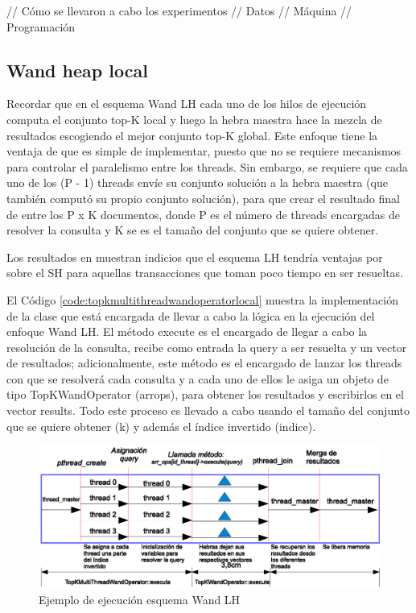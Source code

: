 // Cómo se llevaron a cabo los experimentos
// Datos
// Máquina
// Programación 


\subsection{Wand heap local}
\label{evaluacionexperimental:wlh}
Recordar que en el esquema Wand LH cada uno de los hilos de ejecución computa el conjunto top-K local y luego la hebra maestra hace la mezcla de resultados escogiendo el mejor conjunto top-K global. Este enfoque tiene la ventaja de que es simple de implementar, puesto que no se requiere mecanismos para controlar el paralelismo entre los threads. Sin embargo, se requiere que cada uno de los (P - 1) threads envíe su conjunto solución a la hebra maestra (que también computó su propio conjunto solución), para que crear el resultado final de entre los P x K documentos, donde P es el número de threads encargadas de resolver la consulta y K se es el tamaño del conjunto que se quiere obtener. 

Los resultados en \citep{Rojas:2013} muestran indicios que el esquema LH tendría ventajas por sobre el SH para aquellas transacciones que toman poco tiempo en ser resueltas. 

El Código \ref{code:topkmultithreadwandoperatorlocal} muestra la implementación de la clase que está encargada de llevar a cabo la lógica en la ejecución del enfoque Wand LH. El método execute es el encargado de llegar a cabo la resolución de la consulta, recibe como entrada la query a ser resuelta y un vector de resultados; adicionalmente, este método es el encargado de lanzar los threads con que se resolverá cada consulta y a cada uno de ellos le asiga un objeto de tipo TopKWandOperator (arrops), para obtener los resultados y escribirlos en el vector results. Todo este proceso es llevado a cabo usando el tamaño del conjunto que se quiere obtener (k) y además el índice invertido (indice).


\begin{figure}[!th]
\centering
\includegraphics[scale=.75]{images/ejecucion_wandlh.eps}
\caption{Ejemplo de ejecución esquema Wand LH}
\label{fig:ejecucion_wandlh}
\end{figure}

